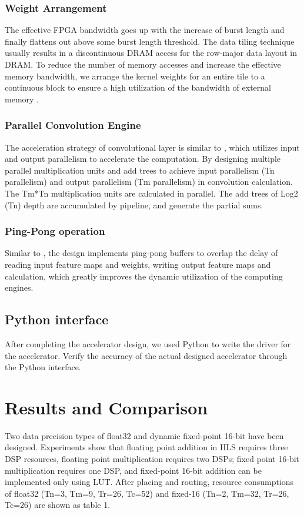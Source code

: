\subsubsection{Weight Arrangement}
The effective FPGA bandwidth goes up with the increase of burst length and finally flattens out above some burst length threshold\cite{zhang2016caffeine}. The data tiling technique usually results in a discontinuous DRAM access for the row-major data layout in DRAM. To reduce the number of memory accesses and increase the effective memory bandwidth, we arrange the kernel weights for an entire tile to a continuous block to ensure a high utilization of the bandwidth of external memory \cite{qiu2016going}.

\subsubsection{Parallel Convolution Engine}
The acceleration strategy of convolutional layer is similar to \cite{zhang2015optimizing, motamedi2017placid}, which utilizes input and output parallelism to accelerate the computation. By designing multiple parallel multiplication units and add trees to achieve input parallelism (Tn parallelism) and output parallelism (Tm parallelism) in convolution calculation. The Tm*Tn multiplication units are calculated in parallel. The add trees of Log2 (Tn) depth are accumulated by pipeline, and generate the partial sums.

\subsubsection{Ping-Pong operation}
Similar to \cite{zhang2015optimizing}, the design implements ping-pong buffers to overlap the delay of reading input feature maps and weights, writing output feature maps and calculation, which greatly improves the dynamic utilization of the computing engines.

\subsection{Python interface}
After completing the accelerator design, we used Python to write the driver for the accelerator. Verify the accuracy of the actual designed accelerator through the Python interface.

\section{Results and Comparison}
Two data precision types of float32 and dynamic fixed-point 16-bit have been designed. Experiments show that floating point addition in HLS requires three DSP resources, floating point multiplication requires two DSPs; fixed point 16-bit multiplication requires one DSP, and fixed-point 16-bit addition can be implemented only using LUT. After placing and routing, resource consumptions of float32 (Tn=3, Tm=9, Tr=26, Tc=52) and fixed-16 (Tn=2, Tm=32, Tr=26, Tc=26) are shown as table 1.

